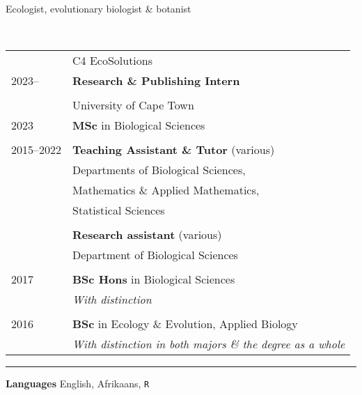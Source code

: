 \documentclass[12pt]{article}
\begin{document}



\bigskip

\hspace{6.75em} Ecologist, evolutionary biologist \& botanist

\

\begin{tabular}{ll}
             & C4 EcoSolutions \\
  2023--     & \textbf{Research \& Publishing Intern} \\
             & \\
             & University of Cape Town \\
  2023       & \textbf{MSc} in Biological Sciences \\
             & \\
  2015--2022 & \textbf{Teaching Assistant \& Tutor} (various) \\
             & Departments of Biological Sciences, \\
             & \hspace{1em} Mathematics \& Applied Mathematics, \\
             & \hspace{1em} Statistical Sciences \\
             & \\
             & \textbf{Research assistant} (various) \\
             & Department of Biological Sciences \\
             & \\
  2017       & \textbf{BSc Hons} in Biological Sciences \\
             & \textit{With distinction} \\
             & \\
  2016       & \textbf{BSc} in Ecology \& Evolution, Applied Biology \\
             & \textit{With distinction in both majors \& the degree as a whole}
\end{tabular}

\bigskip

\hrule %

\bigskip

\textbf{Languages}     \hfill                  English, Afrikaans, \texttt{R}
\end{document}
